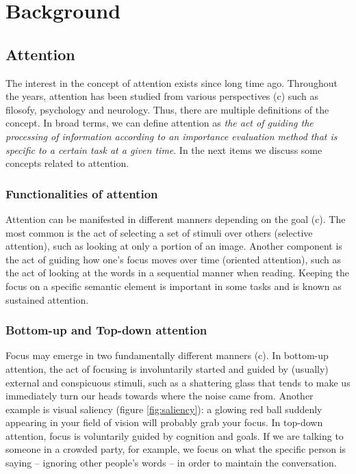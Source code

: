 \documentclass[article]{IEEEtran}
\begin{document}
\section{Background}
\subsection{Attention}
The interest in the concept of attention exists since long time ago.
Throughout the years, attention has been studied
from various perspectives (c) such as filosofy, psychology and neurology.
Thus, there are multiple definitions of the concept.
In broad terms, we can define attention as
\emph{the act of guiding the processing of information
according to an importance evaluation method that is specific to a
certain task at a given time}.
In the next items we discuss some concepts related to attention.

\subsubsection{Functionalities of attention}
Attention can be manifested in different manners depending on the goal (c).
The most common is the act of selecting a set of stimuli over others
(selective attention), such as looking at only a portion of an image.
Another component is the act of guiding how one's focus moves over time
(oriented attention), such as the act of looking at the words in
a sequential manner when reading.
Keeping the focus on a specific semantic element is important in some tasks
and is known as sustained attention.

\subsubsection{Bottom-up and Top-down attention}
Focus may emerge in two fundamentally different manners (c).
In bottom-up attention, the act of focusing is involuntarily
started and guided by (usually) external and conspicuous stimuli,
such as a shattering glass that tends to
make us immediately turn our heads towards where the noise came from.
Another example is visual saliency (figure \ref{fig:saliency}):
a glowing red ball suddenly appearing in
your field of vision will probably grab your focus.
In top-down attention, focus is voluntarily guided by cognition and goals.
If we are talking to someone in a crowded party, for example,
we focus on what the specific person is saying
-- ignoring other people's words -- in order to maintain the conversation.
\end{document}
